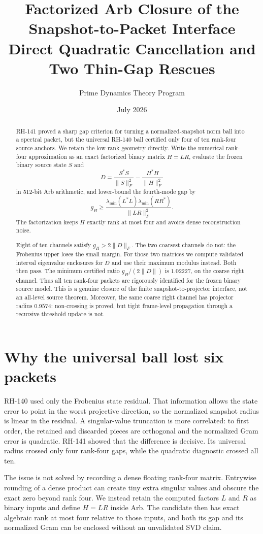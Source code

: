 \documentclass[12pt]{article}
\title{Factorized Arb Closure of the Snapshot-to-Packet Interface\\\large Direct Quadratic Cancellation and Two Thin-Gap Rescues}
\author{Prime Dynamics Theory Program}
\date{July 2026}
\begin{document}
\maketitle

\begin{abstract}
RH-141 proved a sharp gap criterion for turning a normalized-snapshot norm
ball into a spectral packet, but the universal RH-140 ball certified only
four of ten rank-four source anchors.  We retain the low-rank geometry
directly.  Write the numerical rank-four approximation as an exact
factorized binary matrix $H=LR$, evaluate the frozen binary source state $S$
and
\[
 D=\frac{S^*S}{\|S\|_F^2}-\frac{H^*H}{\|H\|_F^2}
\]
in 512-bit Arb arithmetic, and lower-bound the fourth-mode gap by
\[
 g_H\geq
 \frac{\lambda_{\min}(L^*L)\lambda_{\min}(RR^*)}{\|LR\|_F^2}.
\]
The factorization keeps $H$ exactly rank at most four and avoids dense
reconstruction noise.

Eight of ten channels satisfy $g_H>2\|D\|_F$.  The two coarsest channels do
not: the Frobenius upper loses the small margin.  For those two matrices we
compute validated interval eigenvalue enclosures for $D$ and use their
maximum modulus instead.  Both then pass.  The minimum certified ratio
$g_H/(2\|D\|)$ is $1.02227$, on the coarse right channel.  Thus all ten
rank-four packets are rigorously identified for the frozen binary source
model.  This is a genuine closure of the finite snapshot-to-projector
interface, not an all-level source theorem.  Moreover, the same coarse right
channel has projector radius $0.9574$: non-crossing is proved, but tight
frame-level propagation through a recursive threshold update is not.
\end{abstract}

\section{Why the universal ball lost six packets}
RH-140 used only the Frobenius state residual.  That information allows the
state error to point in the worst projective direction, so the normalized
snapshot radius is linear in the residual.  A singular-value truncation is
more correlated: to first order, the retained and discarded pieces are
orthogonal and the normalized Gram error is quadratic.  RH-141 showed that
the difference is decisive.  Its universal radius crossed only four
rank-four gaps, while the quadratic diagnostic crossed all ten.

The issue is not solved by recording a dense floating rank-four matrix.
Entrywise rounding of a dense product can create tiny extra singular values
and obscure the exact zero beyond rank four.  We instead retain the computed
factors $L$ and $R$ as binary inputs and define $H=LR$ inside Arb.  The
candidate then has exact algebraic rank at most four relative to those
inputs, and both its gap and its normalized Gram can be enclosed without an
unvalidated SVD claim.
\end{document}
